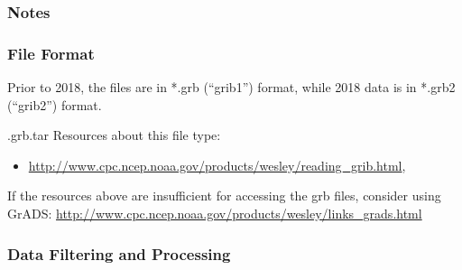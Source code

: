 \subsubsection*{Notes}


\subsubsection*{File Format}

Prior to 2018, the files are in *.grb (``grib1'') format, while 2018 data is in *.grb2 (``grib2'') format.

.grb.tar
Resources about this file type: 
\begin{itemize}
\item \url{http://www.cpc.ncep.noaa.gov/products/wesley/reading_grib.html}, 

\end{itemize}

If the resources above are insufficient for accessing the grb files, consider using GrADS: \url{http://www.cpc.ncep.noaa.gov/products/wesley/links_grads.html}

\subsubsection*{Data Filtering and Processing}

